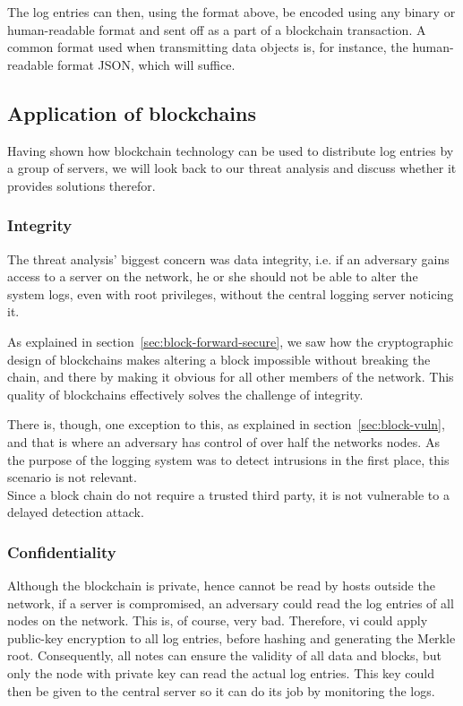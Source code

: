 The log entries can then, using the format above, be encoded using any
binary or human-readable format and sent off as a part of a blockchain
transaction. A common format used when transmitting data objects is,
for instance, the human-readable format JSON, which will suffice.


\subsection{Application of blockchains}
Having shown how blockchain technology can be used to distribute log
entries by a group of servers, we will look back to our threat
analysis and discuss whether it provides solutions therefor.

\subsubsection{Integrity}
The threat analysis' biggest concern was data integrity, i.e. if an
adversary gains access to a server on the network, he or she should
not be able to alter the system logs, even with root privileges,
without the central logging server noticing it.

As explained in section~\ref{sec:block-forward-secure}, we saw how the
cryptographic design of blockchains makes altering a block impossible
without breaking the chain, and there by making it obvious for all
other members of the network. This quality of blockchains effectively
solves the challenge of integrity.

There is, though, one exception to this, as explained in
section~\ref{sec:block-vuln}, and that is where an adversary has
control of over half the networks nodes. As the purpose of the logging
system was to detect intrusions in the first place, this scenario is
not relevant. \\
Since a block chain do not require a trusted third party, it is not vulnerable to a delayed detection attack. 
\subsubsection{Confidentiality}
Although the blockchain is private, hence cannot be read by hosts
outside the network, if a server is compromised, an adversary could
read the log entries of all nodes on the network. This is, of course,
very bad. Therefore, vi could apply public-key encryption to all log
entries, before hashing and generating the Merkle root. Consequently,
all notes can ensure the validity of all data and blocks, but only the
node with private key can read the actual log entries. This key could
then be given to the central server so it can do its job by monitoring
the logs.

